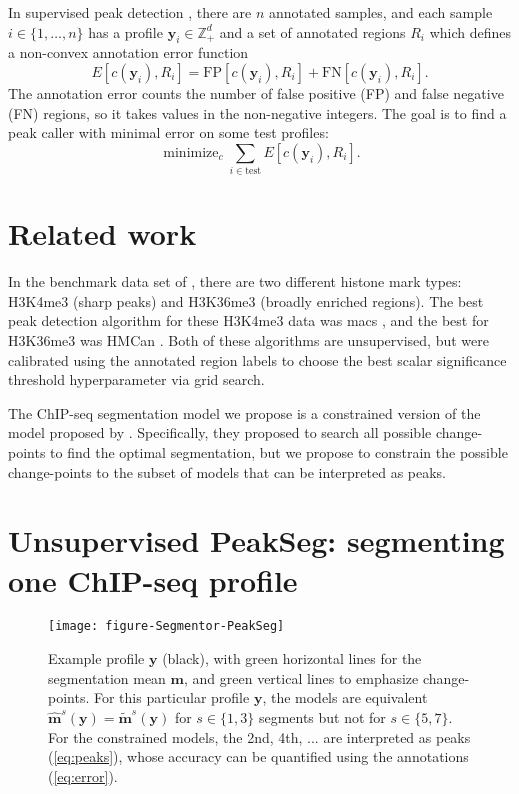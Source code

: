 \documentclass{article}
\DeclareMathOperator*{\minimize}{minimize}
\newcommand{\ZZ}{\mathbb Z}
\begin{document}
In supervised peak detection \citep{hocking2014visual}, there
are $n$ annotated samples, and each sample $i\in\{1, \dots, n\}$ has a
profile $\mathbf y_i\in\ZZ_+^d$ and a set of annotated regions $R_i$
which defines a non-convex annotation error function
\begin{equation}
  \label{eq:error}
  E[c(\mathbf y_i),  R_i] =
  \text{FP}[c(\mathbf y_i), R_i] +
  \text{FN}[c(\mathbf y_i), R_i].
\end{equation}
The annotation error counts the number of false positive (FP) and
false negative (FN) regions, so it takes values in the non-negative
integers. The goal is to find a peak caller with minimal error on some
test profiles:
\begin{equation}
  \label{eq:min_error}
  \minimize_c \sum_{i\in\text{test}} E[c(\mathbf y_i),  R_i].
\end{equation}

\section{Related work}

In the benchmark data set of \citet{hocking2014visual}, there are two
different histone mark types: H3K4me3 (sharp peaks) and H3K36me3
(broadly enriched regions). The best peak detection algorithm for
these H3K4me3 data was macs \citep{MACS}, and the best for H3K36me3
was HMCan \citep{HMCan}. Both of these algorithms are unsupervised,
but were calibrated using the annotated region labels to choose the
best scalar significance threshold hyperparameter via grid search.

The ChIP-seq segmentation model we propose is a constrained version of
the model proposed by \citet{cleynen2013segmentation}. Specifically,
they proposed to search all possible change-points to find the optimal
segmentation, but we propose to constrain the possible change-points to
the subset of models that can be interpreted as peaks.

\section{Unsupervised PeakSeg: segmenting one ChIP-seq profile}

\begin{figure}[b!]
  \centering
  \texttt{[image: figure-Segmentor-PeakSeg]}
  \vskip -0.5cm
  \caption{Example profile $\mathbf y$ (black), with green horizontal
    lines for the segmentation mean $\mathbf m$, and green vertical
    lines to emphasize change-points. For this particular profile
    $\mathbf y$, the models are equivalent $\mathbf{\hat m}^s(\mathbf
    y) = \mathbf{\tilde m}^s(\mathbf y)$ for $s\in\{1, 3\}$ segments
    but not for $s\in\{5, 7\}$. For the constrained models, the 2nd,
    4th, ...  are interpreted as peaks (\ref{eq:peaks}), whose
    accuracy can be quantified using the annotations
    (\ref{eq:error}).}
  \label{fig:profiles}
\end{figure}
\end{document}
